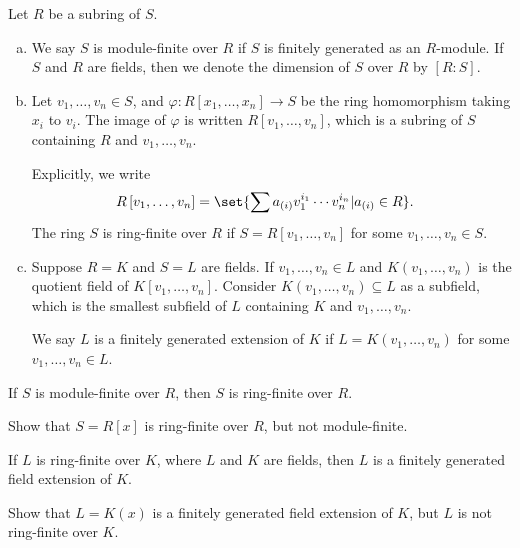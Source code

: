 \documentclass[10pt]{mypackage}
\begin{document}
\begin{definition}
  Let $R$ be a subring of $S$.
  \begin{enumerate}[(a)]
    \item We say $S$ is module-finite over $R$ if $S$ is finitely generated as an $R$-module. If $S$ and $R$ are  fields, then we denote the dimension of $S$ over $R$ by $\left[ R:S \right]$.
    \item Let $v_1,\dots,v_n\in S$, and $\varphi\colon R\left[ x_1,\dots,x_n \right]\rightarrow S$ be the ring homomorphism taking $x_i$ to $v_i$. The image of $\varphi$ is written $R\left[ v_1,\dots,v_n \right]$, which is a subring of $S$ containing $R$ and $v_1,\dots,v_n$.\newline

      Explicitly, we write
      \begin{align*}
        R\left[ v_1,\dots,v_n \right] &= \set{\sum a_{(i)}v_1^{i_1}\cdots v_n^{i_n} | a_{(i)} \in R}.
      \end{align*}
      The ring $S$ is ring-finite over $R$ if $S = R\left[ v_1,\dots,v_n \right]$ for some $v_1,\dots,v_n\in S$.
    \item Suppose $R = K$ and $S = L$ are fields. If $v_1,\dots,v_n\in L$ and $K\left( v_1,\dots,v_n \right)$ is the quotient field of $K\left[ v_1,\dots,v_n \right]$. Consider $K\left( v_1,\dots,v_n \right)\subseteq L$ as a subfield, which is the smallest subfield of $L$ containing $K$ and $v_1,\dots,v_n$.\newline

      We say $L$ is a finitely generated extension of $K$ if $L = K\left( v_1,\dots,v_n \right)$ for some $v_1,\dots,v_n\in L$.
  \end{enumerate}
\end{definition}
\begin{exercise}[Exercise 1.41]
  If $S$ is module-finite over $R$, then $S$ is ring-finite over $R$.
\end{exercise}
\begin{exercise}[Exercise 1.42]
  Show that $S = R\left[ x \right]$ is ring-finite over $R$, but not module-finite.
\end{exercise}
\begin{exercise}[Exercise 1.43]
  If $L$ is ring-finite over $K$, where $L$ and $K$ are fields, then $L$ is a finitely generated field extension of $K$.
\end{exercise}
\begin{exercise}[Exercise 1.44]
  Show that $L = K(x)$ is a finitely generated field extension of $K$, but $L$ is not ring-finite over $K$.
\end{exercise}
\end{document}
